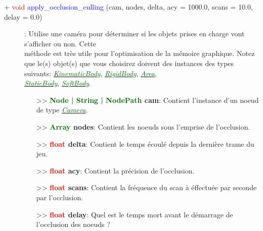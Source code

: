 \documentclass[a4paper, 11pt]{article}
\begin{document}
	\begin{description}
		\item [+ \textcolor{red}{void} \textcolor{blue}{apply\_occlusion\_culling} (cam, nodes, delta, acy = 
		1000.0, scans = 10.0, delay = 0.0)]: Utilise une caméra pour déterminer si les objets prises en
		charge vont s'afficher ou non. Cette \\méthode est très utile pour l'optimisation de la mémoire 
		graphique. Notez que le(s) objet(s) que vous choisirez doivent des instances des types suivants:
		\href{https://docs.godotengine.org/fr/stable/classes/class_kinematicbody.html}
		{\textit{\textcolor{darkgreen}{KinematicBody}}},
		\href{https://docs.godotengine.org/fr/stable/classes/class_rigidbody.html}
		{\textit{\textcolor{darkgreen}{RigidBody}}},
		\href{https://docs.godotengine.org/fr/stable/classes/class_area.html}
		{\textit{\textcolor{darkgreen}{Area}}},
		\href{https://docs.godotengine.org/fr/stable/classes/class_staticbody.html}
		{\textit{\textcolor{darkgreen}{\\StaticBody}}},
		\href{https://docs.godotengine.org/fr/stable/classes/class_softbody.html}
		{\textit{\textcolor{darkgreen}{SoftBody}}}.
		\begin{itemize}
			\item[>> \textbf{\textcolor{darkgreen}{Node | String | NodePath} cam}:] Contient l'instance 
			d'un noeud de type
			\href{https://docs.godotengine.org/fr/stable/classes/class_camera.html}
			{\textit{\textcolor{darkgreen}{Camera}}}.
			\item[>> \textbf{\textcolor{darkgreen}{Array} nodes}:] Contient les noeuds sous l'emprise de
			l'occlusion.
			\item[>> \textbf{\textcolor{red}{float} delta}:] Contient le temps écoulé depuis la dernière 
			trame du jeu.
			\item[>> \textbf{\textcolor{red}{float} acy}:] Contient la précision de l'occlusion.
			\item[>> \textbf{\textcolor{red}{float} scans}:] Contient la fréquence du scan à éffectuée par 
			seconde par l'occlusion.
			\item[>> \textbf{\textcolor{red}{float} delay}:] Quel est le temps mort avant le démarrage de
			l'occlusion des noeuds ?\\
		\end{itemize}
	\end{description}
\end{document}
